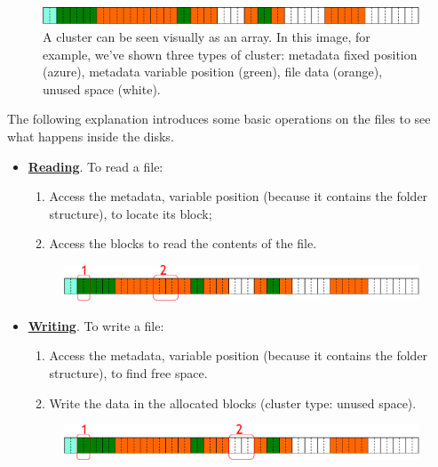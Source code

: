 \begin{figure}[!htp]
    \centering
    \includegraphics[width=\textwidth]{img/files-1.pdf}
    \caption{A cluster can be seen visually as an array. In this image, for example, we've shown three types of cluster: metadata fixed position (azure), metadata variable position (green), file data (orange), unused space (white).}
\end{figure}

\newpage

\noindent
The following explanation introduces some basic operations on the files to see what happens inside the disks.
\begin{itemize}
    \item \underline{\textbf{Reading}}. To read a file:
    \begin{enumerate}
        \item Access the metadata, variable position (because it contains the folder structure), to locate its block;
        \item Access the blocks to read the contents of the file.
    \end{enumerate}
    \begin{figure}[!htp]
        \centering
        \includegraphics[width=\textwidth]{img/files-2.pdf}
    \end{figure}

    \item \underline{\textbf{Writing}}. To write a file:
    \begin{enumerate}
        \item Access the metadata, variable position (because it contains the folder structure), to find free space.
        \item Write the data in the allocated blocks (cluster type: unused space).        
    \end{enumerate}
    \begin{figure}[!htp]
        \centering
        \includegraphics[width=\textwidth]{img/files-3.pdf}
    \end{figure}


\end{itemize}
